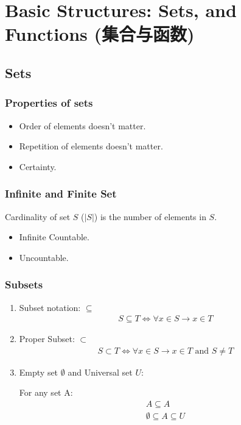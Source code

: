 \section[Basic Structures: Sets, and Functions]{Basic Structures: Sets, and Functions (集合与函数)}

\subsection{Sets}

\subsubsection{Properties of sets}
\begin{itemize}
    \item Order of elements doesn't matter.
    \item Repetition of elements doesn't matter. 
    \item Certainty. 
\end{itemize}

\subsubsection{Infinite and Finite Set}
Cardinality of set $S$ ($\left| S \right|$) is the number of elements in $S$. 
\begin{itemize}
    \item Infinite Countable.
    \item Uncountable. 
\end{itemize}

\subsubsection{Subsets}
\begin{enumerate}
    \item Subset notation: $\subseteq$  
    \begin{align*}
        S \subseteq T \Longleftrightarrow \forall x \in S \longrightarrow x\in T
    \end{align*}
    \item Proper Subset: $\subset $
    \begin{align*}
        S \subset T \Longleftrightarrow \forall x \in S \longrightarrow x\in T \text{ and } S\neq T
    \end{align*}
    \item Empty set $\emptyset $ and Universal set $U$:
    
    For any set A:
    \begin{align*}
        A \subseteq A\\
        \emptyset \subseteq A \subseteq U
    \end{align*}
\end{enumerate}

